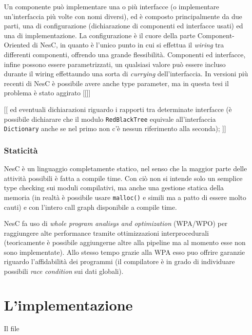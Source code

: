 \documentclass[pdftex,12pt,a4paper,italian,openany]{book}
\begin{document}
Un componente può implementare una o più interfacce (o implementare un'interfaccia più volte 
con nomi diversi), ed è composto principalmente da due parti, una di configurazione 
(dichiarazione di componenti ed interfacce usati) ed una di implementazione.
La configurazione è il cuore della parte Component-Oriented di NesC, in quanto è l'unico punto 
in cui si effettua il \emph{wiring} tra differenti componenti, offrendo una grande flessibilità.
Componenti ed interfacce, infine possono essere parametrizzati, un qualsiasi valore può essere 
incluso durante il wiring effettaundo una sorta di \emph{currying} dell'interfaccia. 
In versioni più recenti di NesC è possibile avere anche type parameter, ma in questa tesi  
il problema è stato aggirato [[]]


[[ ed eventuali dichiarazioni 
riguardo i rapporti tra determinate interfacce (è possibile dichiarare che il modulo 
\texttt{RedBlackTree} equivale all'interfaccia \texttt{Dictionary} anche se nel primo non 
c'è nessun  riferimento alla seconda);  ]]



\subsection{Staticità}

NesC è un linguaggio completamente statico, nel senso che la maggior parte delle attività 
possibili è fatta a compile time. Con ciò non si intende solo un semplice type checking sui 
moduli compilativi, ma anche una gestione statica della memoria (in realtà è possibile usare 
\texttt{malloc()} e simili ma a patto di essere molto cauti) e con l'intero call graph disponibile a compile time. 

NesC fa uso di \emph{whole program analisys and optimization} (WPA/WPO) per raggiungere alte 
performance tramite ottimizzazioni interprocedurali (teoricamente è possibile aggiungerne altre 
alla pipeline ma al momento esse non sono implementate).
Allo stesso tempo grazie alla WPA esso puo offrire garanzie riguardo l'affidabilità dei 
programmi (il compilatore è in grado di individuare possibili \emph{race condition} sui dati globali).


\chapter{L'implementazione}
Il file 
\end{document}
